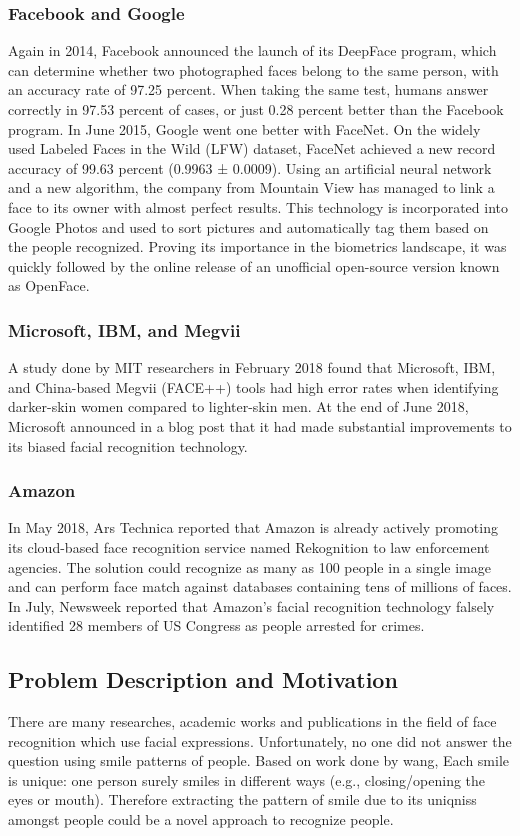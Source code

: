 \documentclass{article}
\begin{document}
\subsubsection{Facebook and Google}
\par{Again in 2014, Facebook announced the launch of its DeepFace program, which can determine whether two photographed faces belong to the same person, with an accuracy rate of 97.25 percent. When taking the same test, humans answer correctly in 97.53 percent of cases, or just 0.28 percent better than the Facebook program. In June 2015, Google went one better with FaceNet. On the widely used Labeled Faces in the Wild (LFW) dataset, FaceNet achieved a new record accuracy of 99.63 percent  (0.9963 ± 0.0009).   
Using an artificial neural network and a new algorithm, the company from Mountain View has managed to link a face to its owner with almost perfect results.  This technology is incorporated into Google Photos and used to sort pictures and automatically tag them based on the people recognized. Proving its importance in the biometrics landscape, it was quickly followed by the online release of an unofficial open-source version known as OpenFace. }
\subsubsection{Microsoft, IBM, and Megvii}
\par{A study done by MIT researchers in February 2018 found that Microsoft, IBM, and China-based Megvii  (FACE++) tools had high error rates when identifying darker-skin women compared to lighter-skin men. At the end of June 2018, Microsoft announced in a blog post that it had made substantial improvements to its biased facial recognition technology.}
\subsubsection{Amazon}
\par{In May 2018, Ars Technica reported that Amazon is already actively promoting its cloud-based face recognition service named Rekognition to law enforcement agencies. The solution could recognize as many as 100 people in a single image and can perform face match against databases containing tens of millions of faces.  In July, Newsweek reported that Amazon’s facial recognition technology falsely identified 28 members of US Congress as people arrested for crimes.}
\subsection{Problem Description and Motivation}
\par{There are many researches, academic works and publications in the field of face recognition which use facial expressions. Unfortunately, no one did not answer the question using  smile patterns of people. Based on work done by wang, Each smile is unique: one person surely smiles in different ways (e.g., closing/opening the eyes or mouth). Therefore extracting the pattern of smile due to its uniqniss amongst people could be a novel approach to recognize people.}
\end{document}
